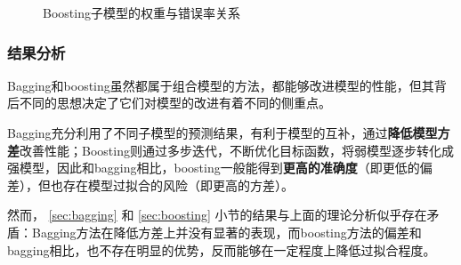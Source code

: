 \documentclass[12pt,a4paper]{article}
\theoremstyle{definition}
\begin{document}
\vspace{-0.012\linewidth}
\begin{figure}[H]
	\centering
	\caption{Boosting子模型的权重与错误率关系}
	\label{fig:boosting-weight-error}
\end{figure}

\subsubsection{结果分析}
\label{sec:dis}

Bagging和boosting虽然都属于组合模型的方法，都能够改进模型的性能，但其背后不同的思想决定了它们对模型的改进有着不同的侧重点。

\vspace{0.015\linewidth}
Bagging充分利用了不同子模型的预测结果，有利于模型的互补，通过\textbf{降低模型方差}改善性能；Boosting则通过多步迭代，不断优化目标函数，将弱模型逐步转化成强模型，因此和bagging相比，boosting一般能得到\textbf{更高的准确度}（即更低的偏差），但也存在模型过拟合的风险（即更高的方差）。

\vspace{0.015\linewidth}
然而， \ref{sec:bagging} 和 \ref{sec:boosting} 小节的结果与上面的理论分析似乎存在矛盾：Bagging方法在降低方差上并没有显著的表现，而boosting方法的偏差和bagging相比，也不存在明显的优势，反而能够在一定程度上降低过拟合程度。
\end{document}
